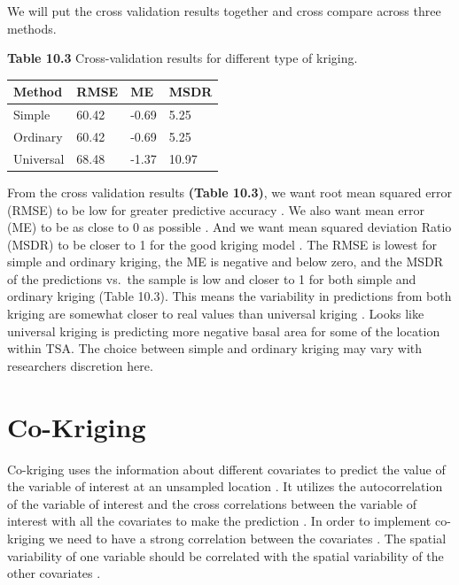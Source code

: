 \documentclass[
]{book}
\begin{document}
We will put the cross validation results together and cross compare across three methods.

\textbf{Table 10.3} Cross-validation results for different type of kriging.

\begin{tabular}{l|l|l|l}
\hline
Method & RMSE & ME & MSDR\\
\hline
Simple & 60.42 & -0.69 & 5.25\\
\hline
Ordinary & 60.42 & -0.69 & 5.25\\
\hline
Universal & 68.48 & -1.37 & 10.97\\
\hline
\end{tabular}

From the cross validation results \textbf{(Table 10.3)}, we want root mean squared error (RMSE) to be low for greater predictive accuracy \citep{tziachris_spatial_2017}. We also want mean error (ME) to be as close to 0 as possible \citep{tziachris_spatial_2017}. And we want mean squared deviation Ratio (MSDR) to be closer to 1 for the good kriging model \citep{tziachris_spatial_2017}. The RMSE is lowest for simple and ordinary kriging, the ME is negative and below zero, and the MSDR of the predictions vs.~the sample is low and closer to 1 for both simple and ordinary kriging (Table 10.3). This means the variability in predictions from both kriging are somewhat closer to real values than universal kriging \citep{tziachris_spatial_2017}. Looks like universal kriging is predicting more negative basal area for some of the location within TSA. The choice between simple and ordinary kriging may vary with researchers discretion here.

\hypertarget{co-kriging}{%
\section{Co-Kriging}\label{co-kriging}}

Co-kriging uses the information about different covariates to predict the value of the variable of interest at an unsampled location \citep{cressie_statistics_1994}. It utilizes the autocorrelation of the variable of interest and the cross correlations between the variable of interest with all the covariates to make the prediction \citep{cressie_statistics_1994}. In order to implement co-kriging we need to have a strong correlation between the covariates \citep{tziachris_spatial_2017}. The spatial variability of one variable should be correlated with the spatial variability of the other covariates \citep{tziachris_spatial_2017}.
\end{document}
